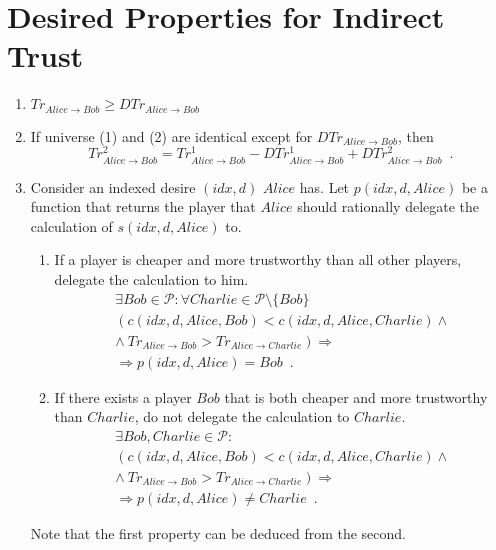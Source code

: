 \section{Desired Properties for Indirect Trust}
  \begin{enumerate}
    \item $Tr_{Alice \rightarrow Bob} \geq DTr_{Alice \rightarrow Bob}$
    \item If universe (1) and (2) are identical except for $DTr_{Alice \rightarrow Bob}$,
    then
      \begin{equation*}
        Tr^2_{Alice \rightarrow Bob} = Tr^1_{Alice \rightarrow Bob} - DTr^1_{Alice
        \rightarrow Bob} + DTr^2_{Alice \rightarrow Bob} \enspace.
      \end{equation*}
    \item Consider an indexed desire $\left(idx, d\right)$ $Alice$ has. Let $p\left(idx,
    d, Alice\right)$ be a function that returns the player that $Alice$ should rationally
    delegate the calculation of $s\left(idx, d, Alice\right)$ to.
      \begin{enumerate}
        \item If a player is cheaper and more trustworthy than all other players, delegate
        the calculation to him.
        \begin{gather*}
          \exists Bob \in \mathcal{P}: \forall Charlie \in \mathcal{P} \setminus \{Bob\}
          \\
          \left(c\left(idx, d, Alice, Bob\right) < c\left(idx, d, Alice, Charlie\right)
          \wedge \right. \\
          \left. \wedge \ Tr_{Alice \rightarrow Bob} > Tr_{Alice \rightarrow
          Charlie}\right) \Rightarrow \\
          \Rightarrow p\left(idx, d, Alice\right) = Bob \enspace.
        \end{gather*}
        \item If there exists a player $Bob$ that is both cheaper and more trustworthy
        than $Charlie$, do not delegate the calculation to $Charlie$.
        \begin{gather*}
          \exists Bob, Charlie \in \mathcal{P}: \\
          \left(c\left(idx, d, Alice, Bob\right) < c\left(idx, d, Alice, Charlie\right)
          \wedge \right. \\
          \left. \wedge \ Tr_{Alice \rightarrow Bob} > Tr_{Alice \rightarrow
          Charlie}\right) \Rightarrow \\
          \Rightarrow p\left(idx, d, Alice\right) \neq Charlie \enspace.
        \end{gather*}
      \end{enumerate}
      Note that the first property can be deduced from the second.
  \end{enumerate}

